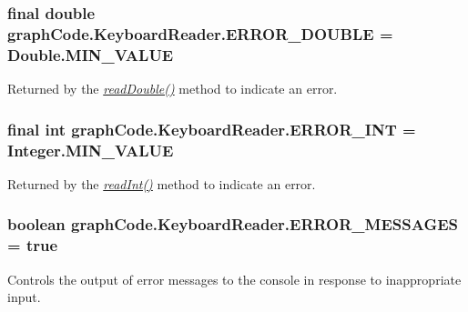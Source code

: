 \subsubsection[{\texorpdfstring{E\+R\+R\+O\+R\+\_\+\+D\+O\+U\+B\+LE}{ERROR_DOUBLE}}]{\setlength{\rightskip}{0pt plus 5cm}final double graph\+Code.\+Keyboard\+Reader.\+E\+R\+R\+O\+R\+\_\+\+D\+O\+U\+B\+LE = Double.\+M\+I\+N\+\_\+\+V\+A\+L\+UE\hspace{0.3cm}{\ttfamily [static]}}\hypertarget{classgraphCode_1_1KeyboardReader_ad4574418c09a66cfb44580e8a2105686}{}\label{classgraphCode_1_1KeyboardReader_ad4574418c09a66cfb44580e8a2105686}
Returned by the {\itshape \hyperlink{classgraphCode_1_1KeyboardReader_ac9ff0d97d041350b957dce4822813ba0}{read\+Double()}} method to indicate an error. 
\subsubsection[{\texorpdfstring{E\+R\+R\+O\+R\+\_\+\+I\+NT}{ERROR_INT}}]{\setlength{\rightskip}{0pt plus 5cm}final int graph\+Code.\+Keyboard\+Reader.\+E\+R\+R\+O\+R\+\_\+\+I\+NT = Integer.\+M\+I\+N\+\_\+\+V\+A\+L\+UE\hspace{0.3cm}{\ttfamily [static]}}\hypertarget{classgraphCode_1_1KeyboardReader_a1169f29de6725738bebd5449cf6da367}{}\label{classgraphCode_1_1KeyboardReader_a1169f29de6725738bebd5449cf6da367}
Returned by the {\itshape \hyperlink{classgraphCode_1_1KeyboardReader_add978b1e4a585c5d7ab75113af2c42fa}{read\+Int()}} method to indicate an error. 
\subsubsection[{\texorpdfstring{E\+R\+R\+O\+R\+\_\+\+M\+E\+S\+S\+A\+G\+ES}{ERROR_MESSAGES}}]{\setlength{\rightskip}{0pt plus 5cm}boolean graph\+Code.\+Keyboard\+Reader.\+E\+R\+R\+O\+R\+\_\+\+M\+E\+S\+S\+A\+G\+ES = true\hspace{0.3cm}{\ttfamily [static]}}\hypertarget{classgraphCode_1_1KeyboardReader_aa3d3742806e17ff6013ef7f5e37bef9f}{}\label{classgraphCode_1_1KeyboardReader_aa3d3742806e17ff6013ef7f5e37bef9f}
Controls the output of error messages to the console in response to inappropriate input. 

